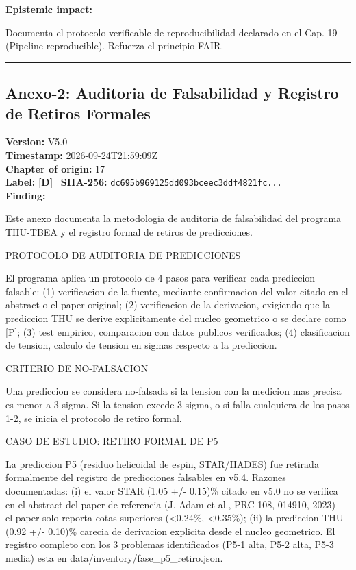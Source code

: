 ﻿\documentclass[11pt,letterpaper]{article}
\begin{document}
\textbf{Epistemic impact:}

Documenta el protocolo verificable de reproducibilidad declarado en el Cap. 19 (Pipeline reproducible). Refuerza el principio FAIR.

\vspace{1em}\hrule\vspace{1em}
\subsection*{Anexo-2: Auditoria de Falsabilidad y Registro de Retiros Formales}
\textbf{Version:} V5.0 \\
\textbf{Timestamp:} 2026-09-24T21:59:09Z \\
\textbf{Chapter of origin:} 17 \\
\textbf{Label:} \textcolor{Dgreen}{\textbf{[D]}} \
\textbf{SHA-256:} \texttt{dc695b969125dd093bceec3ddf4821fc...} \\[0.5em]
\textbf{Finding:}

Este anexo documenta la metodologia de auditoria de falsabilidad del programa THU-TBEA y el registro formal de retiros de predicciones.

PROTOCOLO DE AUDITORIA DE PREDICCIONES

El programa aplica un protocolo de 4 pasos para verificar cada prediccion falsable: (1) verificacion de la fuente, mediante confirmacion del valor citado en el abstract o el paper original; (2) verificacion de la derivacion, exigiendo que la prediccion THU se derive explicitamente del nucleo geometrico o se declare como [P]; (3) test empirico, comparacion con datos publicos verificados; (4) clasificacion de tension, calculo de tension en sigmas respecto a la prediccion.

CRITERIO DE NO-FALSACION

Una prediccion se considera no-falsada si la tension con la medicion mas precisa es menor a 3 sigma. Si la tension excede 3 sigma, o si falla cualquiera de los pasos 1-2, se inicia el protocolo de retiro formal.

CASO DE ESTUDIO: RETIRO FORMAL DE P5

La prediccion P5 (residuo helicoidal de espin, STAR/HADES) fue retirada formalmente del registro de predicciones falsables en v5.4. Razones documentadas: (i) el valor STAR (1.05 +/- 0.15)\% citado en v5.0 no se verifica en el abstract del paper de referencia (J. Adam et al., PRC 108, 014910, 2023) - el paper solo reporta cotas superiores (<0.24\%, <0.35\%); (ii) la prediccion THU (0.92 +/- 0.10)\% carecia de derivacion explicita desde el nucleo geometrico. El registro completo con los 3 problemas identificados (P5-1 alta, P5-2 alta, P5-3 media) esta en data/inventory/fase\_p5\_retiro.json.
\end{document}
